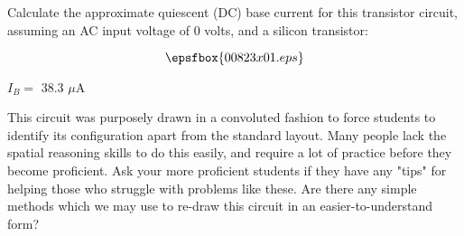 

Calculate the approximate quiescent (DC) base current for this transistor circuit, assuming an AC input voltage of 0 volts, and a silicon transistor:

$$\epsfbox{00823x01.eps}$$







$I_B =$ 38.3 $\mu$A







This circuit was purposely drawn in a convoluted fashion to force students to identify its configuration apart from the standard layout.  Many people lack the spatial reasoning skills to do this easily, and require a lot of practice before they become proficient.  Ask your more proficient students if they have any "tips" for helping those who struggle with problems like these.  Are there any simple methods which we may use to re-draw this circuit in an easier-to-understand form?




